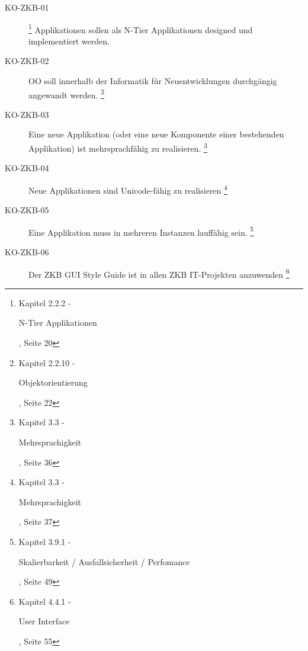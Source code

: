 \documentclass[
11pt, %
a4paper, %
BCOR25mm, %
DIV14, %
footsepline = false, %
headsepline, %
twoside, %
openright,
abstracton, %
listof=totocnumbered, %
bibliography=totocnumbered %
]{scrreprt}
\begin{document}
  \begin{description}

    \item[KO-ZKB-01]
    \footnote{\cite{ZkbHandbuchDerItArchitektur} Kapitel 2.2.2 - \begin{itshape}N-Tier
    Applikationen\end{itshape}, Seite 20}
    Applikationen sollen als N-Tier Applikationen designed und
    implementiert werden.

    \item[KO-ZKB-02] \ac{OO} soll innerhalb der Informatik für Neuentwicklungen
    durchgängig angewandt werden.
    \footnote{\cite{ZkbHandbuchDerItArchitektur} Kapitel 2.2.10 -
    \begin{itshape}Objektorientierung\end{itshape}, Seite 22}

    \item[KO-ZKB-03] Eine neue Applikation (oder eine neue Komponente einer
    bestehenden Applikation) ist mehrsprachfähig zu realisieren.
    \footnote{\cite{ZkbHandbuchDerItArchitektur} Kapitel 3.3 -
    \begin{itshape}Mehrsprachigkeit\end{itshape}, Seite 36}

    \item[KO-ZKB-04] Neue Applikationen sind Unicode-fähig zu realisieren
    \footnote{\cite{ZkbHandbuchDerItArchitektur} Kapitel 3.3 -
    \begin{itshape}Mehrsprachigkeit\end{itshape}, Seite 37}

    \item[KO-ZKB-05] Eine Applikation muss in mehreren Instanzen lauffähig sein.
    \footnote{\cite{ZkbHandbuchDerItArchitektur} Kapitel 3.9.1 -
    \begin{itshape}Skalierbarkeit / Ausfallsicherheit / Perfomance\end{itshape},
    Seite 49}

    \item[KO-ZKB-06] Der ZKB GUI Style Guide ist in allen ZKB IT-Projekten
    anzuwenden
    \footnote{\cite{ZkbHandbuchDerItArchitektur} Kapitel 4.4.1 -
    \begin{itshape}User Interface\end{itshape}, Seite 55}
    

\end{description}
\end{document}
